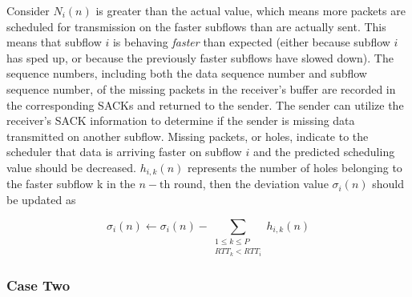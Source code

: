 \documentclass[sigplan,screen,nonacm]{acmart}
\begin{document}
Consider $N_{i}(n)$ is greater than the actual value, which means more packets are scheduled for transmission on the faster subflows than are actually sent.  This means that subflow $i$ is behaving \emph{faster} than expected (either because subflow $i$ has sped up, or because the previously faster subflows have slowed down). The sequence numbers, including both the data sequence number and subflow sequence number, of the missing packets in the receiver's buffer are recorded in the corresponding SACKs and returned to the sender. The sender can utilize the receiver’s SACK information to determine if the sender is missing data transmitted on another subflow. Missing packets, or holes, indicate to the scheduler that data is arriving faster on subflow $i$ and the predicted scheduling value should be decreased. $h_{i,k}(n)$ represents the number of holes belonging to the faster subflow k in the $n-\mathrm{th}$ round, then the deviation value $\sigma_{i}(n)$ should be updated as

\begin{equation} 
\sigma_{i}(n)\leftarrow\sigma_{i}(n)- \sum_{\substack{1\leq k\leq P \\ RTT_{k} < RTT_{i}}}h_{i,k}(n)  
\label{eq:case-one} 
\tag{11} 
\end{equation}

\subsubsection{Case Two}
\end{document}
